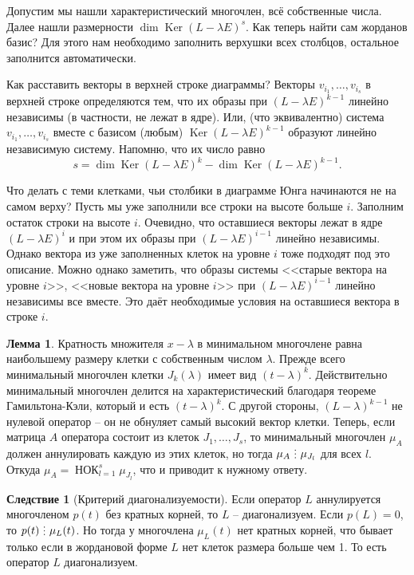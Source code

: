 \documentclass[10pt,a4paper,oneside]{book} %
\theoremstyle{definition}
\newtheorem{lem}{Лемма}
\newtheorem{cor}{Следствие}
\DeclareMathOperator{\Ker}{Ker}
\newcommand{\di}{\mathop{\,\scalebox{0.85}{\raisebox{-1.2pt}[0.5\height]{\vdots}}\,}}
\newcommand{\Nok}{\operatorname{\text{НОК}}}
\def\lm{\begin{lem}}
\def\elm{\end{lem}}
\def\crl{\begin{cor}}
\def\ecrl{\end{cor}}
\begin{document}
\endproof








Допустим мы нашли характеристический многочлен, всё собственные числа. Далее нашли размерности $\dim \Ker(L-\lambda E)^s$. Как теперь найти сам жорданов базис? Для этого нам необходимо заполнить верхушки всех столбцов, остальное заполнится автоматически.



Как расставить векторы в верхней строке диаграммы? Векторы $v_{i_1}, \dots, v_{i_s}$  в верхней строке определяются тем, что их образы при $(L-\lambda E)^{k-1}$ линейно независимы (в частности, не лежат в ядре). Или, (что эквивалентно) система $v_{i_1}, \dots, v_{i_s}$ вместе с базисом (любым) $\Ker (L-\lambda E)^{k-1}$ образуют линейно независимую систему. Напомню, что их число равно
$$s=\dim \Ker (L-\lambda E)^k - \dim \Ker (L-\lambda E)^{k-1}.$$



Что делать с теми клетками, чьи столбики в диаграмме Юнга начинаются не на самом верху? Пусть мы уже заполнили все строки на высоте больше $i$. Заполним остаток строки на высоте $i$.  Очевидно, что оставшиеся векторы лежат в ядре $(L-\lambda E)^{i}$ и при этом их образы при $(L-\lambda E)^{i-1}$ линейно независимы. Однако вектора из уже заполненных клеток на уровне $i$ тоже подходят под это описание. Можно однако заметить, что образы системы <<старые вектора на уровне $i$>>, <<новые вектора на уровне $i$>> при $(L-\lambda E)^{i-1}$ линейно независимы все вместе. Это даёт необходимые условия на оставшиеся вектора в строке $i$.


\lm
Кратность множителя $x-\lambda$ в минимальном многочлене равна наибольшему размеру клетки с собственным числом $\lambda$.
\proof Прежде всего минимальный многочлен клетки $J_k(\lambda)$ имеет вид $(t-\lambda)^k$. Действительно минимальный многочлен делится на характеристический благодаря теореме Гамильтона-Кэли, который и есть $(t-\lambda)^k$. С другой стороны, $(L-\lambda)^{k-1}$ не нулевой оператор -- он не обнуляет самый высокий вектор клетки.
Теперь, если матрица $A$ оператора состоит из клеток $J_1,\dots, J_s$, то минимальный многочлен $\mu_A$ должен аннулировать каждую из этих клеток, но тогда $\mu_A \di \mu_{J_l}$ для всех $l$. Откуда $\mu_A= \Nok_{l=1}^s \mu_{J_l}$, что и приводит к нужному ответу.
\endproof
\elm

\crl[Критерий диагонализуемости] Если оператор $L$ аннулируется многочленом $p(t)$ без кратных корней, то $L$ -- диагонализуем.
\proof Если $p(L)=0$, то $p(t)\di \mu_L(t)$. Но тогда у многочлена $\mu_L(t)$ нет кратных корней, что бывает только если в жордановой форме $L$ нет клеток размера больше чем 1. То есть оператор $L$ диагонализуем. 
\endproof
\ecrl
\end{document}
